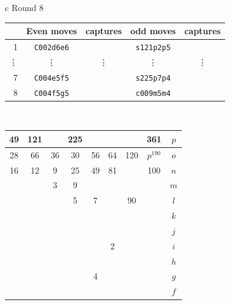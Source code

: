 \documentclass[12pt]{article}
\begin{document}
{\small{
\begin{tabular}{c}
Round 8 \\      
\begin{tabular}{r|cc|cc}
 & Even moves & captures   & odd moves & captures \\    \hline 
1   &  {\tt C002d6e6} & \quad &  {\tt s121p2p5} & \quad \\
\vdots &  \vdots    & \vdots  & \vdots    & \vdots \\  
7   &  {\tt C004e5f5} & \quad &    {\tt s225p7p4} &  \quad \\
8   &  {\tt C004f5g5} & \quad &   {\tt c009m5m4} & \quad \\
\end{tabular}
\\
\begin{tabular}{|c|c|c|c|c|c|c|c||c} \hline
\squadfill{\,}49 & \squadfill{\,}121 & \quad & \squadfill{\,}225 & \quad & \quad & \quad & \squadfill{\,}361 & $p$ \\ \hline
\squadfill{\,}28 & \squadfill{\,}66 & \trianglepafill{\,}36 & \trianglepafill{\,}30 & \trianglepafill{\,}56 & \trianglepafill{\,}64 & \squadfill{\,}120 & \rhombusfill{\,}$p^{190}$ & $o$ \\ \hline
\trianglepafill{\,}16 & \trianglepafill{\,}12 & \circletfill{\,}9 & \circletfill{\,}25 & \circletfill{\,}49 & \circletfill{\,}81 & \quad & \trianglepafill{\,}100 & $n$ \\ \hline
\quad & \quad & \circletfill{\,}3 & \circletfill{\,}9 & \quad & \quad & \quad & \quad & $m$ \\ \hline
\quad & \quad & \quad & \circletfill{\,}5 & \circletfill{\,}7 & \quad & \trianglepafill{\,}90 & \quad & $l$ \\ \hline
\quad & \quad & \quad & \quad & \quad & \quad & \quad & \quad & $k$ \\ \hline
\quad & \quad & \quad & \quad & \quad & \quad & \quad & \quad & $j$ \\ \hline
\quad & \quad & \quad & \quad & \quad & \circlet{\,}2 & \quad & \quad & $i$ \\ \hline
\quad & \quad & \quad & \quad & \quad & \quad & \quad & \quad & $h$ \\ \hline
\quad & \quad & \quad & \quad & \circlet{\,}4 & \quad & \quad & \quad & $g$ \\ \hline
\quad & \quad & \quad & \quad & \quad & \quad & \quad & \quad & $f$ \\ \hline

\end{tabular}
\end{tabular}}}
\end{document}
